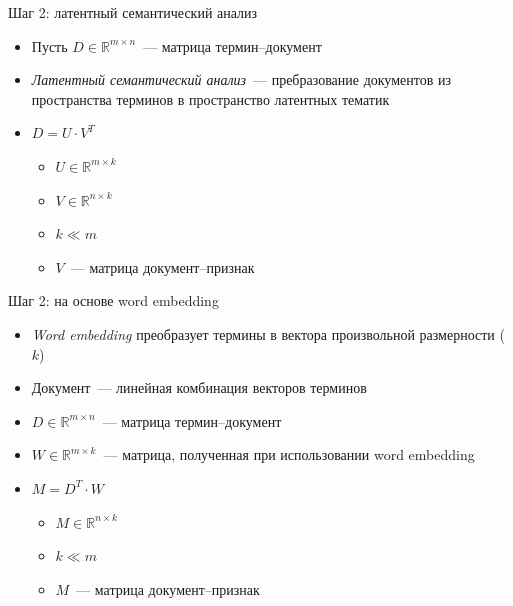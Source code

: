 \documentclass{beamer}
\begin{document}
\begin{frame}{Шаг 2: латентный семантический анализ}
  \begin{itemize}
      \item {Пусть $D \in \mathbb{R}^{m \times n}$~--- матрица термин--документ}
      \item {\textit{Латентный семантический анализ}~--- пребразование документов из пространства
             терминов в пространство латентных тематик}
      \item {$D = U \cdot V^{T}$}
      \begin{itemize}
          \item {$U \in \mathbb{R}^{m \times k}$}
          \item {$V \in \mathbb{R}^{n \times k}$}
          \item {$k \ll m$}
          \item {$V$~--- матрица документ--признак}
      \end{itemize}
  \end{itemize}
\end{frame}

\begin{frame}{Шаг 2: на основе word embedding}
  \begin{itemize}
      \item {\textit{Word embedding} преобразует термины в вектора произвольной размерности ($k$)}
      \item {Документ~--- линейная комбинация векторов терминов}
      \item {$D \in \mathbb{R}^{m \times n}$~--- матрица термин--документ}
      \item {$W \in \mathbb{R}^{m \times k}$~--- матрица, полученная при использовании word embedding}
      \item {$M = D^T \cdot W$}
      \begin{itemize}
          \item {$M \in \mathbb{R}^{n \times k}$}
          \item {$k \ll m$}
          \item {$M$~--- матрица документ--признак}
      \end{itemize}
  \end{itemize}
\end{frame}
\end{document}
